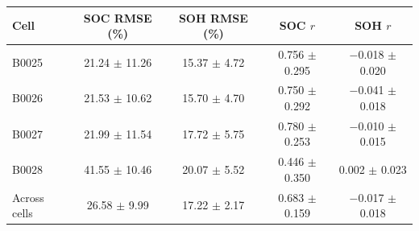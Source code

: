 \begin{tabular}{lcccc}
\toprule
Cell & SOC RMSE (\%) & SOH RMSE (\%) & SOC $r$ & SOH $r$ \\
\midrule
B0025 & 21.24 $\pm$ 11.26 & 15.37 $\pm$ 4.72 & 0.756 $\pm$ 0.295 & $-$0.018 $\pm$ 0.020 \\
B0026 & 21.53 $\pm$ 10.62 & 15.70 $\pm$ 4.70 & 0.750 $\pm$ 0.292 & $-$0.041 $\pm$ 0.018 \\
B0027 & 21.99 $\pm$ 11.54 & 17.72 $\pm$ 5.75 & 0.780 $\pm$ 0.253 & $-$0.010 $\pm$ 0.015 \\
B0028 & 41.55 $\pm$ 10.46 & 20.07 $\pm$ 5.52 & 0.446 $\pm$ 0.350 & 0.002 $\pm$ 0.023 \\
\midrule
Across cells & 26.58 $\pm$ 9.99 & 17.22 $\pm$ 2.17 & 0.683 $\pm$ 0.159 & $-$0.017 $\pm$ 0.018 \\
\bottomrule
\end{tabular}
